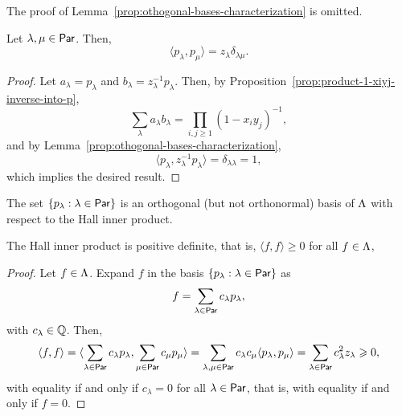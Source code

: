 The proof of Lemma~\ref{prop:othogonal-bases-characterization} is omitted.

\begin{corollary}
	Let \(\lambda, \mu \in \operatorname{\mathsf{Par}}\).
	Then,
	\begin{equation}
		\langle p_\lambda, p_\mu \rangle = z_\lambda \delta_{\lambda\mu}.
	\end{equation}
\end{corollary}

\begin{proof}
	Let \(a_\lambda = p_\lambda\) and \(b_\lambda = z_\lambda^{-1} p_\lambda\).
	Then, by Proposition~\ref{prop:product-1-xiyj-inverse-into-p},
	\begin{equation}
		\sum_{\lambda} a_\lambda b_\lambda = \prod_{i, j \geq 1} (1 - x_iy_j)^{-1},
	\end{equation}
	and by Lemma~\ref{prop:othogonal-bases-characterization},
	\begin{equation}
		\langle p_\lambda, z_\lambda^{-1} p_\lambda \rangle = \delta_{\lambda\lambda} = 1,
	\end{equation}
	which implies the desired result.
\end{proof}

\begin{corollary}
	The set \(\{p_\lambda : \lambda \in \operatorname{\mathsf{Par}}\}\) is an orthogonal (but not orthonormal) basis of \(\operatorname{\Lambda}\) with respect to the Hall inner product.
\end{corollary}

\begin{lemma} \label{lemma:hall-is-positive-definite}
	The Hall inner product is positive definite,
	that is,
	\(\langle f, f \rangle \geq 0\)
	for all \(f \in \operatorname{\Lambda}\),
\end{lemma}

\begin{proof}
	Let \(f \in \operatorname{\Lambda}\).
	Expand \(f\) in the basis \(\{p_\lambda : \lambda \in \operatorname{\mathsf{Par}}\}\) as
	\begin{equation}
		f = \sum_{\lambda \in \operatorname{\mathsf{Par}}} c_\lambda p_\lambda,
	\end{equation}
	with \(c_\lambda \in \mathbb{Q}\).
	Then,
	\begin{equation}
		\langle f, f \rangle =
		\langle
			\sum_{\lambda \in \operatorname{\mathsf{Par}}} c_\lambda p_\lambda,
			\sum_{\mu \in \operatorname{\mathsf{Par}}} c_\mu p_\mu
		\rangle
		=
		\sum_{\lambda, \mu \in \operatorname{\mathsf{Par}}} c_\lambda c_\mu \langle p_\lambda, p_\mu \rangle
		=
		\sum_{\lambda \in \operatorname{\mathsf{Par}}} c_\lambda^2 z_\lambda \geqslant 0,
	\end{equation}
	with equality if and only if \(c_\lambda = 0\) for all \(\lambda \in \operatorname{\mathsf{Par}}\), that is, with equality if and only if \(f = 0\).
\end{proof}

